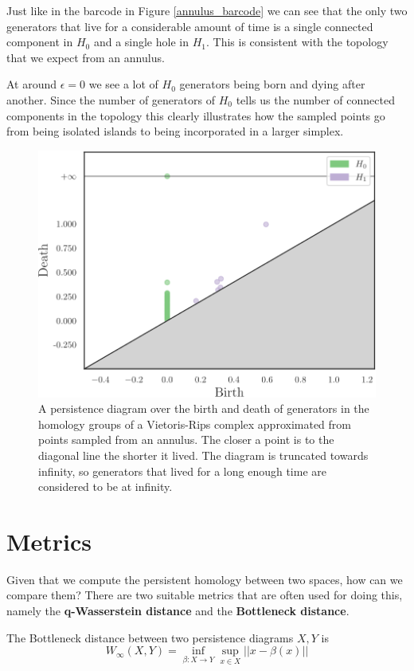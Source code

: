  Just like in the barcode in Figure \ref{annulus_barcode} we can see that the only two generators that live for a considerable amount of time is a single connected component in $H_{0}$ and a single hole in $H_{1}$. This is consistent with the topology that we expect from an annulus.

  At around $\epsilon=0$ we see a lot of $H_{0}$ generators being born and dying after another. Since the number of generators of $H_{0}$ tells us the number of connected components in the topology this clearly illustrates how the sampled points go from being isolated islands to being incorporated in a larger simplex.
  \begin{figure}[ht]
    \centering
    \includegraphics[scale=0.7]{diagram.pdf}
    \caption{\label{pdiagram} A persistence diagram over the birth and death of generators in the homology groups of a Vietoris-Rips complex approximated from points sampled from an annulus. The closer a point is to the diagonal line the shorter it lived. The diagram is truncated towards infinity, so generators that lived for a long enough time are considered to be at infinity.}
  \end{figure}

  \section{Metrics}
Given that we compute the persistent homology between two spaces, how can we compare them? There are two suitable metrics that are often used for doing this, namely the \textbf{q-Wasserstein distance} and the \textbf{Bottleneck distance}.
  \begin{definition}
    The Bottleneck distance between two persistence diagrams $X,Y$ is
    \[W_{\infty}(X,Y) = \inf_{\beta: X \to Y} \sup_{x \in X} ||x-\beta(x)||\]
  \end{definition}

